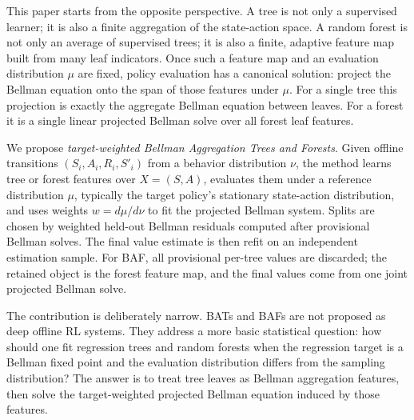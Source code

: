 \documentclass{article}
\theoremstyle{plain}
\theoremstyle{definition}
\theoremstyle{remark}
\begin{document}
This paper starts from the opposite perspective. A tree is not only a
supervised learner; it is also a finite aggregation of the state-action space.
A random forest is not only an average of supervised trees; it is also a
finite, adaptive feature map built from many leaf indicators. Once such a
feature map and an evaluation distribution \(\mu\) are fixed, policy evaluation
has a canonical solution: project the Bellman equation onto the span of those
features under \(\mu\). For a single tree this projection is exactly the
aggregate Bellman equation between leaves. For a forest it is a single linear
projected Bellman solve over all forest leaf features.

We propose \emph{target-weighted Bellman Aggregation Trees and Forests}. Given
offline transitions \((S_i,A_i,R_i,S'_i)\) from a behavior distribution
\(\nu\), the method learns tree or forest features over \(X=(S,A)\), evaluates
them under a reference distribution \(\mu\), typically the target policy's
stationary state-action distribution, and uses weights \(w=d\mu/d\nu\) to fit
the projected Bellman system. Splits are chosen by weighted held-out Bellman
residuals computed after provisional Bellman solves. The final value estimate
is then refit on an independent estimation sample. For BAF, all provisional
per-tree values are discarded; the retained object is the forest feature map,
and the final values come from one joint projected Bellman solve.

The contribution is deliberately narrow. BATs and BAFs are not proposed as deep
offline RL systems. They address a more basic statistical question: how should
one fit regression trees and random forests when the regression target is a
Bellman fixed point and the evaluation distribution differs from the sampling
distribution? The answer is to treat tree leaves as Bellman aggregation
features, then solve the target-weighted projected Bellman equation induced by
those features.
\end{document}

